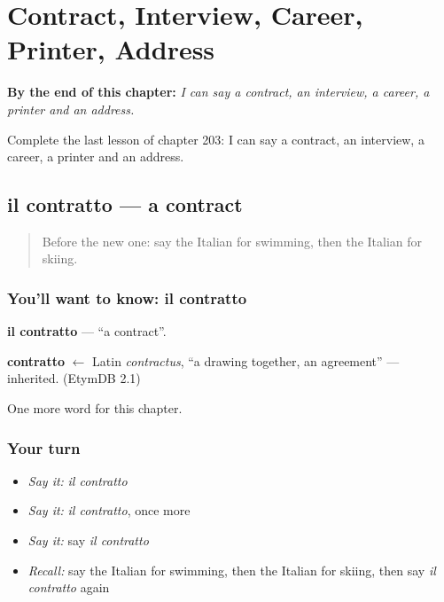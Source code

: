 
\chapter{Contract, Interview, Career, Printer, Address}
\label{ch:it-contract-interview-career-printer-address}

\begin{chapteropening}
\textbf{By the end of this chapter:} \emph{I can say a contract, an interview, a career, a printer and an address.}

Complete the last lesson of chapter 203: I can say a contract, an interview, a career, a printer and an address.
\end{chapteropening}

\section[il contratto]{il contratto — a contract}

\label{lesson:IT-C203-contratto}



\begin{quote}
Before the new one: say the Italian for swimming, then the Italian for skiing.
\end{quote}

\subsection*{You'll want to know: il contratto}
\textbf{il contratto} — \textquotedblleft{}a contract\textquotedblright{}.

\begin{cousinweb}
\textbf{contratto} $\leftarrow$ Latin \emph{contractus}, \textquotedblleft{}a drawing together, an agreement\textquotedblright{} — inherited. (EtymDB 2.1)
\end{cousinweb}

\begin{grammarlens}[title={What you've built}]
One more word for this chapter.
\end{grammarlens}

\subsection*{Your turn}
\begin{itemize}
\raggedright
  \item \emph{Say it:} \emph{il contratto}
  \item \emph{Say it:} \emph{il contratto}, once more
  \item \emph{Say it:} say \emph{il contratto}
  \item \emph{Recall:} say the Italian for swimming, then the Italian for skiing, then say \emph{il contratto} again
\end{itemize}

